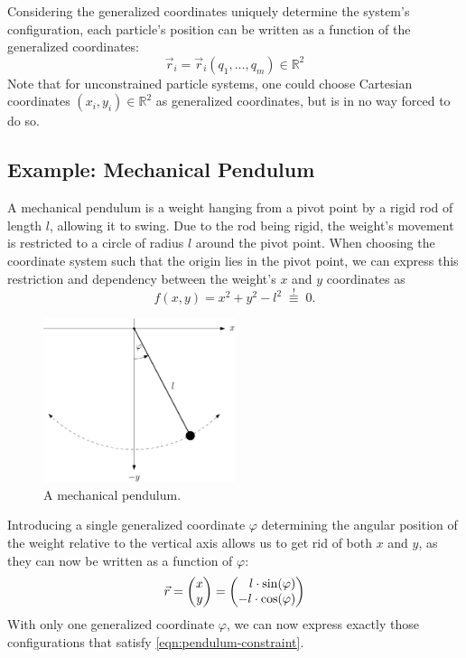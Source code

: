 Considering the generalized coordinates uniquely determine the system's configuration, each particle's position can be written as a function of the generalized coordinates:
%
\begin{equation*}
  \vec{r}_i = \vec{r}_i(q_1, \ldots , q_m) \in \mathbb{R}^2
\end{equation*}
%
Note that for unconstrained particle systems, one could choose Cartesian coordinates ${(x_i, y_i) \in \mathbb{R}^2}$ as generalized coordinates, but is in no way forced to do so.





\subsection*{Example: Mechanical Pendulum}
A mechanical pendulum is a weight hanging from a pivot point by a rigid rod of length ${l}$, allowing it to swing. Due to the rod being rigid, the weight's movement is restricted to a circle of radius ${l}$ around the pivot point. When choosing the coordinate system such that the origin lies in the pivot point, we can express this restriction and dependency between the weight's ${x}$ and ${y}$ coordinates as
%
\begin{equation}
  f(x,y) = x^2 + y^2 - l^2 \;\stackrel{!}{\equiv}\; 0.
  \label{eqn:pendulum-constraint}
\end{equation}

\begin{figure}[H]
  \centering\includegraphics[width=0.5\textwidth]{Resources/Figures/Mechanical-Pendulum.pdf}
  \caption{A mechanical pendulum.}
  \label{fig:generalized-coordinates-for-pendulum}
\end{figure}

\noindent
Introducing a single generalized coordinate ${\varphi}$ determining the angular position of the weight relative to the vertical axis allows us to get rid of both ${x}$ and ${y}$, as they can now be written as a function of ${\varphi}$:
%
\begin{equation*}
  \vec{r}
  = \begin{pmatrix} x \\ y \end{pmatrix}
  = \begin{pmatrix*}[r] l \cdot \eval{\sin}{\varphi} \\ -l \cdot \eval{\cos}{\varphi} \end{pmatrix*}
\end{equation*}
%
With only one generalized coordinate ${\varphi}$, we can now express exactly those configurations that satisfy \cref{eqn:pendulum-constraint}.
